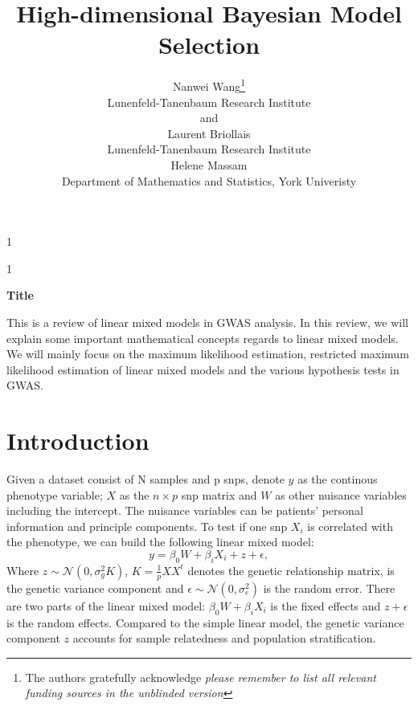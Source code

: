 \documentclass[12pt]{article}
\newcommand{\blind}{1}
\def\N{\mathcal{N}}
\numberwithin{equation}{section}
\begin{document}
\def\spacingset#1{\renewcommand{\baselinestretch}%
{#1}\small\normalsize} \spacingset{1}



\blind
{
  \title{\bf High-dimensional Bayesian Model Selection }
  \author{Nanwei Wang\thanks{
    The authors gratefully acknowledge \textit{please remember to list all relevant funding sources in the unblinded version}}\hspace{.2cm}\\
    Lunenfeld-Tanenbaum Research Institute\\
    and \\
    Laurent Briollais \\
    Lunenfeld-Tanenbaum Research Institute\\
    Helene Massam\\
    Department of Mathematics and Statistics, York Univeristy}
  \maketitle
} \fi

\blind
{
  \bigskip
  \bigskip
  \bigskip
  \begin{center}
    {\LARGE\bf Title}
\end{center}
  \medskip
} \fi

\bigskip
\abstract
This is a review of linear mixed models in GWAS analysis. In this review, we will explain some important mathematical concepts regards to  linear mixed models. We will mainly focus on the maximum likelihood estimation, restricted maximum likelihood estimation of linear mixed models and the various hypothesis tests in GWAS. 
\section{Introduction}
Given a dataset consist of N samples and p snps, denote $y$ as the continous phenotype variable; $X$ as the $n\times p$ snp matrix and $W$ as other nuisance variables including the intercept. The nuisance variables can be patients' personal information and principle components. 
To test if one snp $X_i$ is correlated with the phenotype, we can build the following linear mixed model:
\begin{equation}
\label{eq:lmm}
y=\beta_0W+\beta_i X_i+z+\epsilon,
\end{equation}
Where $z \sim \N(0,\sigma_g^2K)$, $K=\frac{1}{p}XX^t$ denotes the genetic relationship matrix, is the genetic variance component and $\epsilon\sim \N(0, \sigma_e^2)$ is the random error. There are two parts of the linear mixed model: $\beta_0W+\beta_i X_i$ is the fixed effects and $z+\epsilon$ is the random effects. Compared to the simple linear model, the genetic variance component $z$ accounts for sample relatedness and population stratification.  
\end{document}
